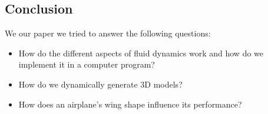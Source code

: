 \documentclass[a4paper,12pt]{article}
\begin{document}
\subsection{Conclusion}
We our paper we tried to answer the following questions: 
\begin{itemize}
	\item{How do the different aspects of fluid dynamics work and how do we implement it in a computer program?}
	\item{How do we dynamically generate 3D models?}
	\item{How does an airplane's wing shape influence its performance?}
\end{itemize}

\nocite{*}
\printbibliography
\end{document}
